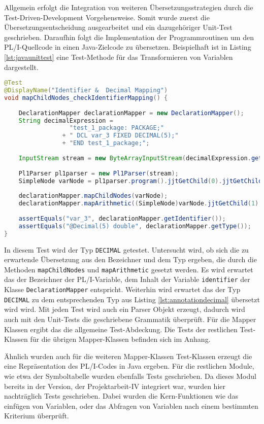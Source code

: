 Allgemein erfolgt die Integration von weiteren Übersetzungsstrategien durch die Test-Driven-Development Vorgehensweise.
Somit wurde zuerst die Übersetzungsentscheidung ausgearbeitet und ein dazugehöriger Unit-Test geschrieben.
Daraufhin folgt die Implementation der Programmroutinen um den PL/I-Quellcode in einen Java-Zielcode zu übersetzen.
Beispielhaft ist in Listing \ref{lst:javaunittest} eine Test-Methode für das Transformieren von Variablen dargestellt.

\begin{lstlisting}[language=Java, caption=Arithmetic Node Unit-test, label={lst:javaunittest}]
@Test
@DisplayName("Identifier &  Decimal Mapping")
void mapChildNodes_checkIdentifierMapping() {
	
	DeclarationMapper declarationMapper = new DeclarationMapper();
	String decimalExpression = 
				  "test_1_package: PACKAGE;" 
				+ "	DCL var_3 FIXED DECIMAL(5);" 
				+ "END test_1_package;";
	
	InputStream stream = new ByteArrayInputStream(decimalExpression.getBytes(StandardCharsets.UTF_8));
	
	Pl1Parser pl1parser = new Pl1Parser(stream);
	SimpleNode varNode = pl1parser.program().jjtGetChild(0).jjtGetChild(1);
		
	declarationMapper.mapChildNodes(varNode);
	declarationMapper.mapArithmetic((SimpleNode)varNode.jjtGetChild(1).jjtGetChild(0));
		
	assertEquals("var_3", declarationMapper.getIdentifier());
	assertEquals("@Decimal(5) double", declarationMapper.getType());
}
\end{lstlisting} 

In diesem Test wird der Typ \verb+DECIMAL+ getestet. Untersucht wird, ob sich die zu erwartende Übersetzung 
aus den Bezeichner und dem Typ ergeben, die durch die Methoden \verb+mapChildNodes+ und \verb+mapArithmetic+
gesetzt werden.
Es wird erwartet das der Bezeichner der PL/I-Variable, dem Inhalt der Variable \verb+identifier+ der Klasse \verb+DeclarationMapper+ entspricht.
Weiterhin wird erwartet das der Typ \verb+DECIMAL+ zu dem entsprechenden Typ aus Listing \ref{lst:annotationdecimal}
übersetzt wird wird.
Mit jeden Test wird auch ein Parser Objekt erzeugt, dadurch wird auch mit den Unit-Tests die geschriebene Grammatik überprüft.
Für die Mapper Klassen ergibt das die allgemeine Test-Abdeckung.
Die Tests der restlichen Test-Klassen für die übrigen Mapper-Klassen befinden sich im Anhang.

Ähnlich wurden auch für die weiteren Mapper-Klassen Test-Klassen erzeugt die eine Repräsentation des PL/I-Codes in Java ergeben.
Für die restlichen Module, wie etwa der Symboltabelle wurden ebenfalls Tests geschrieben.
Da dieses Modul bereits in der Version, der Projektarbeit-IV integriert war, wurden hier nachträglich Tests geschrieben.
Dabei wurden die Kern-Funktionen wie das einfügen von Variablen, oder das Abfragen von Variablen nach einem bestimmten Kriterium überprüft. 

